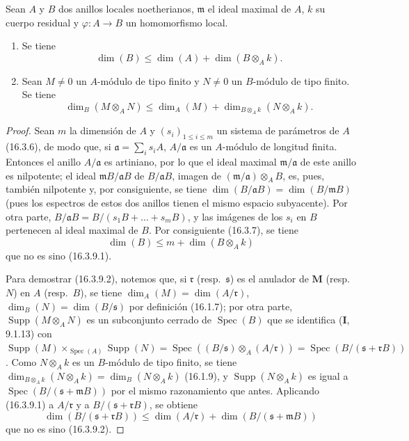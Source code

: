 \begin{proposition}[16.3.9]
\label{0.16.3.9-fr}
Sean $A$ y $B$ dos anillos locales noetherianos, $\mathfrak{m}$ el ideal
maximal de $A$, $k$ su cuerpo residual y $\varphi:A\to B$ un homomorfismo
local.
\begin{enumerate}
  \item[\rm{(i)}] Se tiene
  \begin{equation}
  \label{0.16.3.9.1-fr}
  \tag{16.3.9.1}
    \dim(B)\leq\dim(A)+\dim(B\otimes_A k).
  \end{equation}
  \item[\rm{(ii)}] Sean $M\neq0$ un $A$-módulo de tipo finito y $N\neq0$ un
  $B$-módulo de tipo finito. Se tiene
  \begin{equation}
  \label{0.16.3.9.2-fr}
  \tag{16.3.9.2}
    \dim_B(M\otimes_A N)
    \leq\dim_A(M)+\dim_{B\otimes_A k}(N\otimes_A k).
  \end{equation}
\end{enumerate}
\end{proposition}

\begin{proof}
Sean $m$ la dimensión de $A$ y $(s_i)_{1\leq i\leq m}$ un sistema de
parámetros de $A$ (16.3.6), de modo que, si
$\mathfrak{a}=\sum_i s_iA$, $A/\mathfrak{a}$ es un $A$-módulo de longitud
finita. Entonces el anillo $A/\mathfrak{a}$ es artiniano, por lo que el ideal
maximal $\mathfrak{m}/\mathfrak{a}$ de este anillo es nilpotente; el ideal
$\mathfrak{m}B/\mathfrak{a}B$ de $B/\mathfrak{a}B$, imagen de
$(\mathfrak{m}/\mathfrak{a})\otimes_A B$, es, pues, también nilpotente y, por
consiguiente, se tiene
$\dim(B/\mathfrak{a}B)=\dim(B/\mathfrak{m}B)$ (pues los espectros de estos dos
anillos tienen el mismo espacio subyacente). Por otra parte,
$B/\mathfrak{a}B=B/(s_1B+\ldots+s_mB)$, y las imágenes de los $s_i$ en $B$
pertenecen al ideal maximal de $B$. Por consiguiente (16.3.7), se tiene
\[
  \dim(B)\leq m+\dim(B\otimes_A k)
\]
que no es sino (16.3.9.1).

Para demostrar (16.3.9.2), notemos que, si $\mathfrak{r}$
(resp.~$\mathfrak{s}$) es el anulador de $\mathbf{M}$ (resp.~$N$)
en $A$ (resp.~$B$), se tiene
$\dim_A(M)=\dim(A/\mathfrak{r})$, $\dim_B(N)=\dim(B/\mathfrak{s})$ por
definición (16.1.7); por otra parte, $\operatorname{Supp}(M\otimes_A N)$ es un
subconjunto cerrado de $\operatorname{Spec}(B)$ que se identifica (\textbf I, 9.1.13)
con
$\operatorname{Supp}(M)\times_{\operatorname{Spec}(A)}\operatorname{Supp}(N)=\operatorname{Spec}((B/\mathfrak{s})\otimes_A(A/\mathfrak{r}))=\operatorname{Spec}(B/(\mathfrak{s}+\mathfrak{r}B))$.
Como $N\otimes_A k$ es un $B$-módulo de tipo finito, se tiene
$\dim_{B\otimes_A k}(N\otimes_A k)=\dim_B(N\otimes_A k)$ (16.1.9), y
$\operatorname{Supp}(N\otimes_A k)$ es igual a
$\operatorname{Spec}(B/(\mathfrak{s}+\mathfrak{m}B))$ por el mismo
razonamiento que antes. Aplicando (16.3.9.1) a $A/\mathfrak{r}$ y a
$B/(\mathfrak{s}+\mathfrak{r}B)$, se obtiene
\[
  \dim(B/(\mathfrak{s}+\mathfrak{r}B))
  \leq\dim(A/\mathfrak{r})+
  \dim(B/(\mathfrak{s}+\mathfrak{m}B))
\]
que no es sino (16.3.9.2).
\end{proof}

